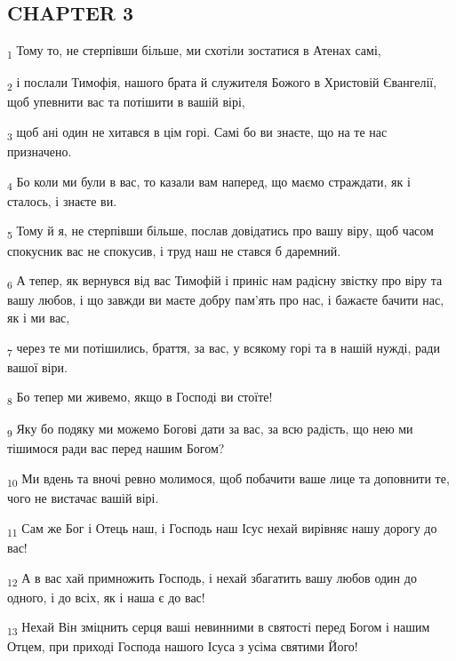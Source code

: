 \subsection{CHAPTER 3}
\begin{tcolorbox}
\textsubscript{1} Тому то, не стерпівши більше, ми схотіли зостатися в Атенах самі,
\end{tcolorbox}
\begin{tcolorbox}
\textsubscript{2} і послали Тимофія, нашого брата й служителя Божого в Христовій Євангелії, щоб упевнити вас та потішити в вашій вірі,
\end{tcolorbox}
\begin{tcolorbox}
\textsubscript{3} щоб ані один не хитався в цім горі. Самі бо ви знаєте, що на те нас призначено.
\end{tcolorbox}
\begin{tcolorbox}
\textsubscript{4} Бо коли ми були в вас, то казали вам наперед, що маємо страждати, як і сталось, і знаєте ви.
\end{tcolorbox}
\begin{tcolorbox}
\textsubscript{5} Тому й я, не стерпівши більше, послав довідатись про вашу віру, щоб часом спокусник вас не спокусив, і труд наш не стався б даремний.
\end{tcolorbox}
\begin{tcolorbox}
\textsubscript{6} А тепер, як вернувся від вас Тимофій і приніс нам радісну звістку про віру та вашу любов, і що завжди ви маєте добру пам'ять про нас, і бажаєте бачити нас, як і ми вас,
\end{tcolorbox}
\begin{tcolorbox}
\textsubscript{7} через те ми потішились, браття, за вас, у всякому горі та в нашій нужді, ради вашої віри.
\end{tcolorbox}
\begin{tcolorbox}
\textsubscript{8} Бо тепер ми живемо, якщо в Господі ви стоїте!
\end{tcolorbox}
\begin{tcolorbox}
\textsubscript{9} Яку бо подяку ми можемо Богові дати за вас, за всю радість, що нею ми тішимося ради вас перед нашим Богом?
\end{tcolorbox}
\begin{tcolorbox}
\textsubscript{10} Ми вдень та вночі ревно молимося, щоб побачити ваше лице та доповнити те, чого не вистачає вашій вірі.
\end{tcolorbox}
\begin{tcolorbox}
\textsubscript{11} Сам же Бог і Отець наш, і Господь наш Ісус нехай вирівняє нашу дорогу до вас!
\end{tcolorbox}
\begin{tcolorbox}
\textsubscript{12} А в вас хай примножить Господь, і нехай збагатить вашу любов один до одного, і до всіх, як і наша є до вас!
\end{tcolorbox}
\begin{tcolorbox}
\textsubscript{13} Нехай Він зміцнить серця ваші невинними в святості перед Богом і нашим Отцем, при приході Господа нашого Ісуса з усіма святими Його!
\end{tcolorbox}

